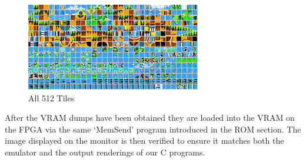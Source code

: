 \documentclass{article}
\begin{document}
\vfill
\begin{figure}[H]
    \centering
    \begin{minipage}[H]{0.8\linewidth}
        \centering
        \includegraphics[width=\textwidth]{../images/tiles.png}
        \caption{All 512 Tiles}
        \label{fig:tiles}
    \end{minipage}
\end{figure}
\vfill
\newpage

After the VRAM dumps have been obtained they are loaded into the VRAM on the
FPGA via the same `MemSend' program introduced in the ROM section. The image
displayed on the monitor is then verified to ensure it matches both the
emulator and the output renderings of our C programs.
\end{document}
